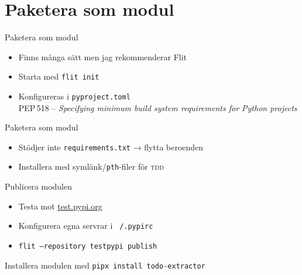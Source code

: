 \section{Paketera som modul}

\begin{frame}{Paketera som modul}
  \begin{itemize}
    \item Finns många sätt men jag rekommenderar Flit
    \item Starta med \texttt{flit init}
    \item Konfigureras i \texttt{pyproject.toml}\\
      PEP\,518 -- {\small\textit{Specifying minimum build system requirements for Python projects}}
  \end{itemize}
\end{frame}

\begin{frame}{Paketera som modul}
  \begin{itemize}
    \item Stödjer inte \texttt{requirements.txt} → flytta beroenden
    \item Installera med symlänk/\texttt{pth}-filer för \textsc{tdd}
  \end{itemize}
\end{frame}

\begin{frame}[fragile]{Publicera modulen}
  \begin{itemize}
    \item Testa mot \url{test.pypi.org}
    \item Konfigurera egna servrar i \texttt{~/.pypirc}
    \item \texttt{flit --repository testpypi publish}
  \end{itemize}

  \vfill

  Installera modulen med \texttt{pipx install todo-extractor}

\end{frame}
